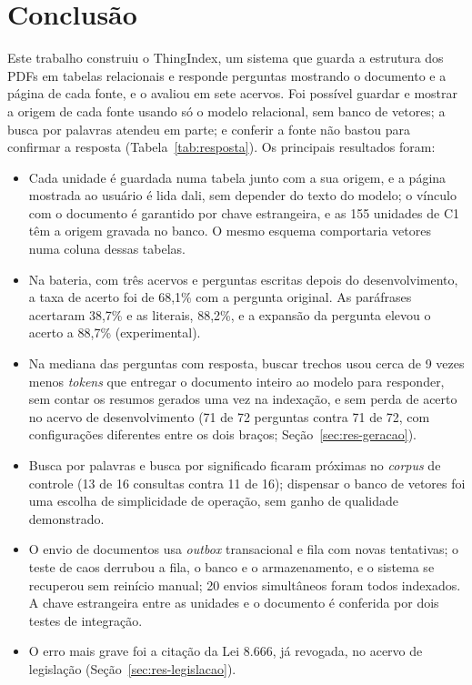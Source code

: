 \documentclass[12pt]{article}
\begin{document}
\section{Conclusão}
\label{sec:conclusao}

Este trabalho construiu o ThingIndex, um sistema que guarda a estrutura dos PDFs em tabelas relacionais e responde perguntas mostrando o documento e a página de cada fonte, e o avaliou em sete acervos. Foi possível guardar e mostrar a origem de cada fonte usando só o modelo relacional, sem banco de vetores; a busca por palavras atendeu em parte; e conferir a fonte não bastou para confirmar a resposta (Tabela~\ref{tab:resposta}). Os principais resultados foram:

\begin{itemize}
  \item Cada unidade é guardada numa tabela junto com a sua origem, e a página mostrada ao usuário é lida dali, sem depender do texto do modelo; o vínculo com o documento é garantido por chave estrangeira, e as 155 unidades de C1 têm a origem gravada no banco. O mesmo esquema comportaria vetores numa coluna dessas tabelas.
  \item Na bateria, com três acervos e perguntas escritas depois do desenvolvimento, a taxa de acerto foi de 68,1\% com a pergunta original. As paráfrases acertaram 38,7\% e as literais, 88,2\%, e a expansão da pergunta elevou o acerto a 88,7\% (experimental).
  \item Na mediana das perguntas com resposta, buscar trechos usou cerca de 9 vezes menos \emph{tokens} que entregar o documento inteiro ao modelo para responder, sem contar os resumos gerados uma vez na indexação, e sem perda de acerto no acervo de desenvolvimento (71 de 72 perguntas contra 71 de 72, com configurações diferentes entre os dois braços; Seção~\ref{sec:res-geracao}).
  \item Busca por palavras e busca por significado ficaram próximas no \emph{corpus} de controle (13 de 16 consultas contra 11 de 16); dispensar o banco de vetores foi uma escolha de simplicidade de operação, sem ganho de qualidade demonstrado.
  \item O envio de documentos usa \emph{outbox} transacional e fila com novas tentativas; o teste de caos derrubou a fila, o banco e o armazenamento, e o sistema se recuperou sem reinício manual; 20 envios simultâneos foram todos indexados. A chave estrangeira entre as unidades e o documento é conferida por dois testes de integração.
  \item O erro mais grave foi a citação da Lei 8.666, já revogada, no acervo de legislação (Seção~\ref{sec:res-legislacao}).
\end{itemize}
\end{document}
